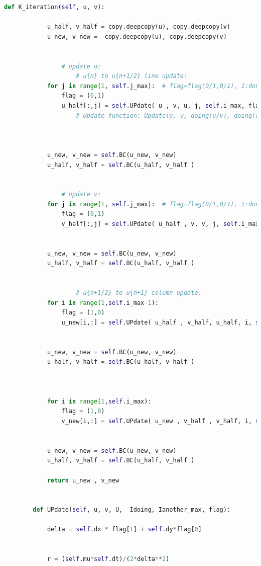 \documentclass[12pt]{article}
\begin{document}
\begin{scriptsize}
\begin{lstlisting}[language=python,caption={ADI Solver}]
        def K_iteration(self, u, v):
    
            u_half, v_half = copy.deepcopy(u), copy.deepcopy(v)
            u_new, v_new =  copy.deepcopy(u), copy.deepcopy(v)
    
    
                # update u:
                    # u{n} to u{n+1/2} line update:
            for j in range(1, self.j_max):  # flag=flag(0/1,0/1), 1:donig 0:other
                flag = (0,1)
                u_half[:,j] = self.UPdate( u , v, u, j, self.i_max, flag)
                    # Update function: Update(u, v, doing(u/v), doing(row=j/column=i), doingAnother, flag)
                
    
    
            u_new, v_new = self.BC(u_new, v_new)
            u_half, v_half = self.BC(u_half, v_half )
                
            
                # update v:
            for j in range(1, self.j_max):  # flag=flag(0/1,0/1), 1:donig 0:other
                flag = (0,1)
                v_half[:,j] = self.UPdate( u_half , v, v, j, self.i_max, flag)
            
    
            u_new, v_new = self.BC(u_new, v_new)
            u_half, v_half = self.BC(u_half, v_half )
    
                    
                    # u{n+1/2} to u{n+1} column update:
            for i in range(1,self.i_max-1):
                flag = (1,0)
                u_new[i,:] = self.UPdate( u_half , v_half, u_half, i, self.j_max, flag)
            
    
            u_new, v_new = self.BC(u_new, v_new)
            u_half, v_half = self.BC(u_half, v_half )
                
    
    
            for i in range(1,self.i_max):
                flag = (1,0)
                v_new[i,:] = self.UPdate( u_new , v_half , v_half, i, self.j_max, flag)
            
    
            u_new, v_new = self.BC(u_new, v_new)
            u_half, v_half = self.BC(u_half, v_half )
    
            return u_new , v_new
        
    
        def UPdate(self, u, v, U,  Idoing, Ianother_max, flag):
    
            delta = self.dx * flag[1] + self.dy*flag[0]
    
    
            r = (self.mu*self.dt)/(2*delta**2)
    

\end{lstlisting}
\end{scriptsize}
\end{document}
